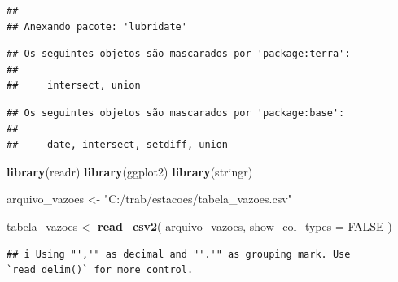 \documentclass[
]{article}
\newenvironment{Shaded}{\begin{snugshade}}{\end{snugshade}}
\newcommand{\AttributeTok}[1]{\textcolor[rgb]{0.13,0.29,0.53}{#1}}
\newcommand{\ConstantTok}[1]{\textcolor[rgb]{0.56,0.35,0.01}{#1}}
\newcommand{\FunctionTok}[1]{\textcolor[rgb]{0.13,0.29,0.53}{\textbf{#1}}}
\newcommand{\NormalTok}[1]{#1}
\newcommand{\OtherTok}[1]{\textcolor[rgb]{0.56,0.35,0.01}{#1}}
\newcommand{\StringTok}[1]{\textcolor[rgb]{0.31,0.60,0.02}{#1}}
\begin{document}
\begin{verbatim}
## 
## Anexando pacote: 'lubridate'
\end{verbatim}

\begin{verbatim}
## Os seguintes objetos são mascarados por 'package:terra':
## 
##     intersect, union
\end{verbatim}

\begin{verbatim}
## Os seguintes objetos são mascarados por 'package:base':
## 
##     date, intersect, setdiff, union
\end{verbatim}

\begin{Shaded}
\begin{Highlighting}[]
\FunctionTok{library}\NormalTok{(readr)}
\FunctionTok{library}\NormalTok{(ggplot2)}
\FunctionTok{library}\NormalTok{(stringr)}

\NormalTok{arquivo\_vazoes }\OtherTok{\textless{}{-}} \StringTok{"C:/trab/estacoes/tabela\_vazoes.csv"}

\NormalTok{tabela\_vazoes }\OtherTok{\textless{}{-}} \FunctionTok{read\_csv2}\NormalTok{(}
\NormalTok{  arquivo\_vazoes,}
  \AttributeTok{show\_col\_types =} \ConstantTok{FALSE}
\NormalTok{)}
\end{Highlighting}
\end{Shaded}

\begin{verbatim}
## i Using "','" as decimal and "'.'" as grouping mark. Use `read_delim()` for more control.
\end{verbatim}
\end{document}
